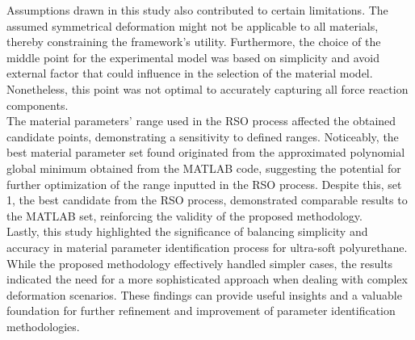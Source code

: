 Assumptions drawn in this study also contributed to certain limitations. The assumed symmetrical
deformation might not be applicable to all materials, thereby constraining the framework's
utility. Furthermore, the choice of the middle point for the experimental model was based on
simplicity and avoid external factor that could influence in the selection of the material 
model. Nonetheless, this point was not optimal to accurately capturing all force reaction 
components.\\

The material parameters' range used in the RSO process affected the obtained candidate points, 
demonstrating a sensitivity to defined ranges. Noticeably, the best material parameter set 
found originated from the approximated polynomial global minimum obtained from the MATLAB code, 
suggesting the potential for further optimization of the range inputted in the RSO process. 
Despite this, set \SI{1}{}, the best candidate from the RSO process, demonstrated comparable 
results to the MATLAB set, reinforcing the validity of the proposed methodology.\\

Lastly, this study highlighted the significance
of balancing simplicity and accuracy in material parameter identification process for ultra-soft polyurethane. 
While the proposed methodology effectively handled simpler cases, the results indicated
the need for a more sophisticated approach when dealing with complex deformation scenarios.
These findings can provide useful insights and a valuable foundation for further refinement and 
improvement of parameter identification methodologies.








